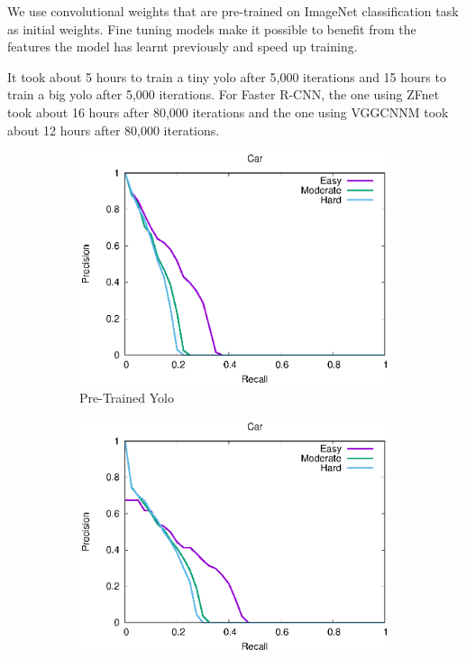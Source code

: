 We use convolutional weights that are pre-trained on ImageNet classification task as initial weights. Fine tuning models make it possible to benefit from the features the model has learnt previously and speed up training. 

It took about 5 hours to train a tiny yolo after 5,000 iterations
and 15 hours to train a big yolo after 5,000 iterations.
For Faster R-CNN, the one using ZFnet took about 16 hours after 
80,000 iterations and the one using VGG\textunderscore CNN\textunderscore M
took about 12 hours after 80,000 iterations.



\begin{figure}[h!]
\centering
\begin{subfigure}[t]{.32\textwidth}
    \centering
    \includegraphics[width=1.0\linewidth]{img/yolo_Nov_4/plot_valid_30/car_detection.eps}
    \caption{Pre-Trained Yolo}
\end{subfigure}%
\begin{subfigure}[t]{.32\textwidth}
    \centering
    \includegraphics[width=1.0\linewidth]{img/yolo_Dec_7_tiny/plot_valid_30/car_detection.eps}

\end{subfigure}
\end{figure}
